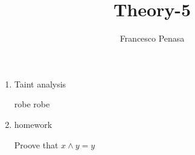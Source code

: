 \documentclass[11pt]{article}
\begin{document}
\author{Francesco Penasa}
\title{Theory-5}
\maketitle

\medskip

\begin{enumerate}

\item
Taint analysis

robe robe 

\item homework

Proove that $ x \wedge y = y $


\end{enumerate}
\end{document}
